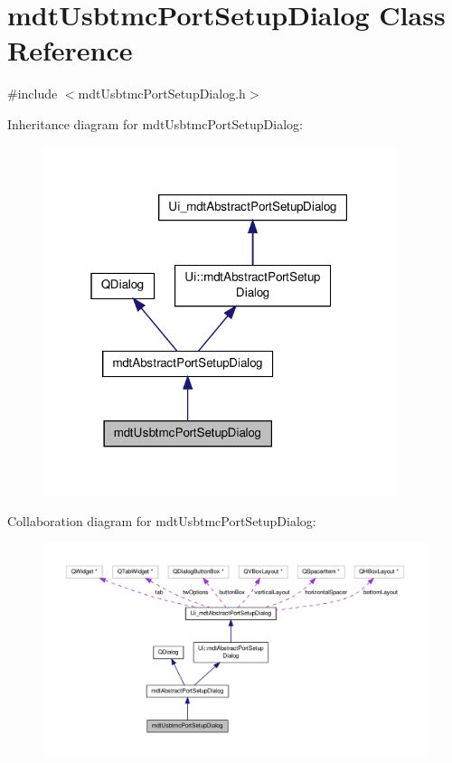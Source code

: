 \hypertarget{classmdt_usbtmc_port_setup_dialog}{\section{mdt\-Usbtmc\-Port\-Setup\-Dialog Class Reference}
\label{classmdt_usbtmc_port_setup_dialog}
}


{\ttfamily \#include $<$mdt\-Usbtmc\-Port\-Setup\-Dialog.\-h$>$}



Inheritance diagram for mdt\-Usbtmc\-Port\-Setup\-Dialog\-:
\nopagebreak
\begin{figure}[H]
\begin{center}
\leavevmode
\includegraphics[width=292pt]{classmdt_usbtmc_port_setup_dialog__inherit__graph}
\end{center}
\end{figure}


Collaboration diagram for mdt\-Usbtmc\-Port\-Setup\-Dialog\-:
\nopagebreak
\begin{figure}[H]
\begin{center}
\leavevmode
\includegraphics[width=350pt]{classmdt_usbtmc_port_setup_dialog__coll__graph}
\end{center}
\end{figure}
